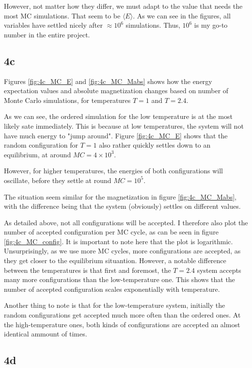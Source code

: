 \documentclass[10pt,showpacs,preprintnumbers,footinbib,amsmath,amssymb,aps,prl,twocolumn,groupedaddress,superscriptaddress,showkeys]{revtex4-1}
\newcommand{\magnitude}[1]{\times 10^{#1}}
\begin{document}
However, not matter how they differ, we must adapt to the value that needs the most MC simulations. That seem to be $\langle E \rangle$. As we can see in the figures, all variables have settled nicely after $\approx 10^6$ simulations. Thus, $10^6$ is my go-to number in the entire project.

\subsection*{4c}

Figures \ref{fig:4c_MC_E} and \ref{fig:4c_MC_Mabs} shows how the energy expectation values and absolute magnetization changes based on number of Monte Carlo simulations, for temperatures $T = 1$ and $T = 2.4$. 

As we can see, the ordered simulation for the low temperature is at the most likely sate immediately. This is because at low temperatures, the system will not have much energy to "jump around". Figure \ref{fig:4c_MC_E} shows that the random configuration for $T = 1$ also rather quickly settles down to an equilibrium, at around $MC = 4\magnitude{3}$.

However, for higher temperatures, the energies of both configurations will oscillate, before they settle at round $MC = 10^5$.

The situation seem similar for the magnetization in figure \ref{fig:4c_MC_Mabs}, with the difference being that the system (obviously) settles on different values.

As detailed above, not all configurations will be accepted. I therefore also plot the number of accepted configuration per MC cycle, as can be seen in figure \ref{fig:4c_MC_config}. It is important to note here that the plot is logarithmic. Unsurprisingly, as we use more MC cycles, more configurations are accepted, as they get closer to the equilibrium situantion. However, a notable difference between the temperatures is that first and foremost, the $T = 2.4$ system accepts many more  configurations than the low-temperature one. This shows that the number of accepted configuration scales exponentially with temperature.

Another thing to note is that for the low-temperature system, initially the random configurations get accepted much more often than the ordered ones. At the high-temperature ones, both kinds of configurations are accepted an almost identical ammount of times.

\subsection*{4d}
\end{document}
